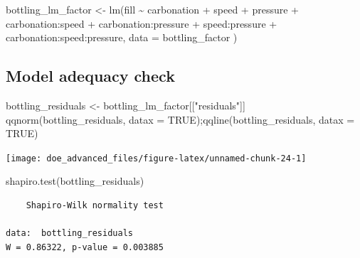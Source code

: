 \documentclass[
]{book}
\newenvironment{Shaded}{\begin{snugshade}}{\end{snugshade}}
\newcommand{\AttributeTok}[1]{\textcolor[rgb]{0.77,0.63,0.00}{#1}}
\newcommand{\ConstantTok}[1]{\textcolor[rgb]{0.00,0.00,0.00}{#1}}
\newcommand{\FunctionTok}[1]{\textcolor[rgb]{0.00,0.00,0.00}{#1}}
\newcommand{\NormalTok}[1]{#1}
\newcommand{\OtherTok}[1]{\textcolor[rgb]{0.56,0.35,0.01}{#1}}
\newcommand{\SpecialCharTok}[1]{\textcolor[rgb]{0.00,0.00,0.00}{#1}}
\newcommand{\StringTok}[1]{\textcolor[rgb]{0.31,0.60,0.02}{#1}}
\begin{document}
\begin{Shaded}
\begin{Highlighting}[]
\NormalTok{bottling\_lm\_factor }\OtherTok{\textless{}{-}} \FunctionTok{lm}\NormalTok{(fill }\SpecialCharTok{\textasciitilde{}} 
\NormalTok{                           carbonation }\SpecialCharTok{+}\NormalTok{ speed }\SpecialCharTok{+}\NormalTok{ pressure }\SpecialCharTok{+} 
\NormalTok{                           carbonation}\SpecialCharTok{:}\NormalTok{speed }\SpecialCharTok{+} 
\NormalTok{                           carbonation}\SpecialCharTok{:}\NormalTok{pressure }\SpecialCharTok{+} 
\NormalTok{                           speed}\SpecialCharTok{:}\NormalTok{pressure }\SpecialCharTok{+} 
\NormalTok{                           carbonation}\SpecialCharTok{:}\NormalTok{speed}\SpecialCharTok{:}\NormalTok{pressure,}
                           \AttributeTok{data =}\NormalTok{ bottling\_factor}
\NormalTok{  )}
\end{Highlighting}
\end{Shaded}

\hypertarget{model-adequacy-check}{%
\subsection{Model adequacy check}\label{model-adequacy-check}}

\begin{Shaded}
\begin{Highlighting}[]
\NormalTok{bottling\_residuals }\OtherTok{\textless{}{-}}\NormalTok{ bottling\_lm\_factor[[}\StringTok{"residuals"}\NormalTok{]]}
\FunctionTok{qqnorm}\NormalTok{(bottling\_residuals, }\AttributeTok{datax =} \ConstantTok{TRUE}\NormalTok{);}\FunctionTok{qqline}\NormalTok{(bottling\_residuals, }\AttributeTok{datax =} \ConstantTok{TRUE}\NormalTok{)}
\end{Highlighting}
\end{Shaded}

\texttt{[image: doe\_advanced\_files/figure-latex/unnamed-chunk-24-1]}

\begin{Shaded}
\begin{Highlighting}[]
\FunctionTok{shapiro.test}\NormalTok{(bottling\_residuals)}
\end{Highlighting}
\end{Shaded}

\begin{verbatim}
	Shapiro-Wilk normality test

data:  bottling_residuals
W = 0.86322, p-value = 0.003885
\end{verbatim}
\end{document}
